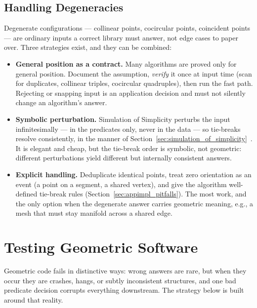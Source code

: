 \subsection{Handling Degeneracies}
\label{sec:appimpl_degeneracies}
Degenerate configurations --- collinear points,
cocircular points, coincident points --- are ordinary
inputs a correct library must answer, not edge cases to paper over. Three
strategies exist, and they can be combined:

\begin{itemize}
  \item {}\textbf{General position as a contract.}
        Many algorithms are proved only for general position. Document the
        assumption, \emph{verify} it once at input time (scan for
        duplicates, collinear triples, cocircular quadruples), then run the
        fast path. Rejecting or snapping input is an application decision
        and must not silently change an algorithm's answer.
  \item {}\textbf{Symbolic perturbation.}
        Simulation of Simplicity perturbs the input infinitesimally --- in
        the predicates only, never in the data --- so tie-breaks resolve
        consistently, in the manner of
        Section~\ref{sec:simulation_of_simplicity}~\cite{edelsbrunner1990}.
        It is elegant and cheap, but the tie-break order is symbolic, not
        geometric: different perturbations yield different but internally
        consistent answers.
  \item \textbf{Explicit handling.} Deduplicate identical points, treat zero
        orientation as an event (a point on a segment, a shared vertex),
        and give the algorithm well-defined tie-break rules
        (Section~\ref{sec:appimpl_pitfalls}). The most work, and the only
        option when the degenerate answer carries geometric meaning, e.g.,
        a mesh that must stay manifold across a shared edge.
\end{itemize}
\section{Testing Geometric Software}
\label{sec:app_impl_testing}
Geometric code fails in distinctive ways: wrong answers are rare, but when
they occur they are crashes, hangs, or subtly inconsistent structures, and
one bad predicate decision corrupts everything downstream. The strategy
below is built around that reality.

